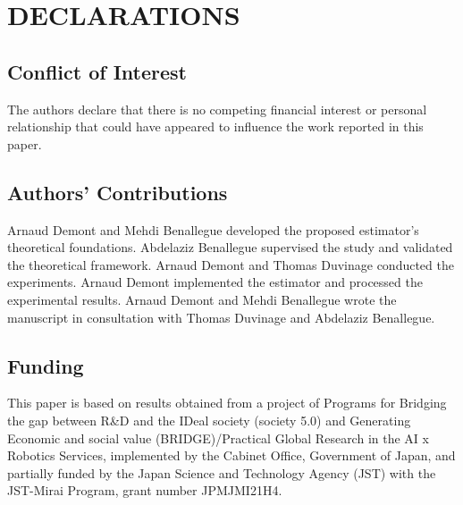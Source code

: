 \documentclass{IJCAS}
\begin{document}
\section*{DECLARATIONS}

\subsection*{Conflict of Interest }
The authors declare that there is no competing financial interest or personal relationship that could have appeared to influence the work reported in this paper.

\subsection*{Authors' Contributions}
Arnaud Demont and Mehdi Benallegue developed the proposed estimator's theoretical foundations. Abdelaziz Benallegue supervised the study and validated the theoretical framework. Arnaud Demont and Thomas Duvinage conducted the experiments. Arnaud Demont implemented the estimator and processed the experimental results. Arnaud Demont and Mehdi Benallegue wrote the manuscript in consultation with Thomas Duvinage and Abdelaziz Benallegue.

\subsection*{Funding }
This paper is based on results obtained from a project of Programs for Bridging the gap between R\&D and the IDeal society (society 5.0) and Generating Economic and social value (BRIDGE)/Practical Global Research in the AI x Robotics Services, implemented by the Cabinet Office, Government of Japan, and partially funded by the Japan Science and Technology Agency (JST) with the JST-Mirai Program, grant number JPMJMI21H4.


% 
% 





\end{document}

